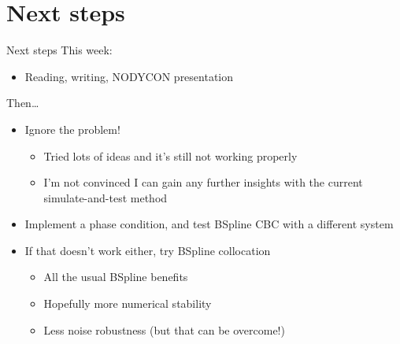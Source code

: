 \documentclass[presentation]{beamer}
\begin{document}
\section{Next steps}
\label{sec:org660aaef}
\begin{frame}[label={sec:orgc7eace8}]{Next steps}
This week:
\vfill
\begin{itemize}
\item Reading, writing, NODYCON presentation
\end{itemize}
\vfill
Then\ldots{}
\begin{itemize}
\item Ignore the problem!
\begin{itemize}
\item Tried lots of ideas and it's still not working properly
\item I'm not convinced I can gain any further insights with the current simulate-and-test method
\end{itemize}
\item Implement a phase condition, and test BSpline CBC with a different system
\item If that doesn't work either, try BSpline collocation
\begin{itemize}
\item All the usual BSpline benefits
\item Hopefully more numerical stability
\item Less noise robustness (but that can be overcome!)
\end{itemize}
\end{itemize}
\end{frame}
\end{document}
